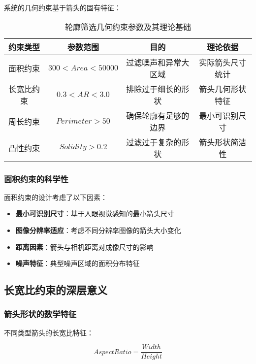 \documentclass[12pt]{article}
\begin{document}
系统的几何约束基于箭头的固有特征：

\begin{table}[H]
\centering
\caption{轮廓筛选几何约束参数及其理论基础}
\begin{tabular}{|c|c|c|c|}
\hline
\textbf{约束类型} & \textbf{参数范围} & \textbf{目的} & \textbf{理论依据} \\
\hline
面积约束 & $300 < Area < 50000$ & 过滤噪声和异常大区域 & 实际箭头尺寸统计 \\
\hline
长宽比约束 & $0.3 < AR < 3.0$ & 排除过于细长的形状 & 箭头几何形状特征 \\
\hline
周长约束 & $Perimeter > 50$ & 确保轮廓有足够的边界 & 最小可识别尺寸 \\
\hline
凸性约束 & $Solidity > 0.2$ & 过滤过于复杂的形状 & 箭头形状简洁性 \\
\hline
\end{tabular}
\end{table}

\subsubsection{面积约束的科学性}

面积约束的设计考虑了以下因素：

\begin{itemize}
    \item \textbf{最小可识别尺寸}：基于人眼视觉感知的最小箭头尺寸
    \item \textbf{图像分辨率适应}：考虑不同分辨率图像的箭头大小变化
    \item \textbf{距离因素}：箭头与相机距离对成像尺寸的影响
    \item \textbf{噪声特征}：典型噪声区域的面积分布特征
\end{itemize}

\subsection{长宽比约束的深层意义}

\subsubsection{箭头形状的数学特征}

不同类型箭头的长宽比特征：

\begin{equation}
AspectRatio = \frac{Width}{Height}
\end{equation}
\end{document}
